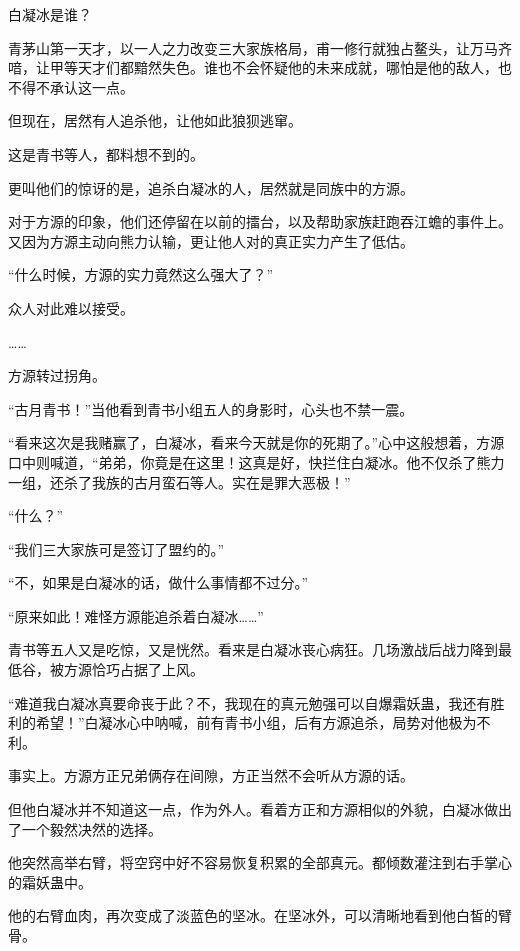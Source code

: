 
\begin{this_body}



白凝冰是谁？

青茅山第一天才，以一人之力改变三大家族格局，甫一修行就独占鳌头，让万马齐喑，让甲等天才们都黯然失色。谁也不会怀疑他的未来成就，哪怕是他的敌人，也不得不承认这一点。

但现在，居然有人追杀他，让他如此狼狈逃窜。

这是青书等人，都料想不到的。

更叫他们的惊讶的是，追杀白凝冰的人，居然就是同族中的方源。

对于方源的印象，他们还停留在以前的擂台，以及帮助家族赶跑吞江蟾的事件上。又因为方源主动向熊力认输，更让他人对的真正实力产生了低估。

“什么时候，方源的实力竟然这么强大了？”

众人对此难以接受。

……

方源转过拐角。

“古月青书！”当他看到青书小组五人的身影时，心头也不禁一震。

“看来这次是我赌赢了，白凝冰，看来今天就是你的死期了。”心中这般想着，方源口中则喊道，“弟弟，你竟是在这里！这真是好，快拦住白凝冰。他不仅杀了熊力一组，还杀了我族的古月蛮石等人。实在是罪大恶极！”

“什么？”

“我们三大家族可是签订了盟约的。”

“不，如果是白凝冰的话，做什么事情都不过分。”

“原来如此！难怪方源能追杀着白凝冰……”

青书等五人又是吃惊，又是恍然。看来是白凝冰丧心病狂。几场激战后战力降到最低谷，被方源恰巧占据了上风。

“难道我白凝冰真要命丧于此？不，我现在的真元勉强可以自爆霜妖蛊，我还有胜利的希望！”白凝冰心中呐喊，前有青书小组，后有方源追杀，局势对他极为不利。

事实上。方源方正兄弟俩存在间隙，方正当然不会听从方源的话。

但他白凝冰并不知道这一点，作为外人。看着方正和方源相似的外貌，白凝冰做出了一个毅然决然的选择。

他突然高举右臂，将空窍中好不容易恢复积累的全部真元。都倾数灌注到右手掌心的霜妖蛊中。

他的右臂血肉，再次变成了淡蓝色的坚冰。在坚冰外，可以清晰地看到他白皙的臂骨。


\end{this_body}
